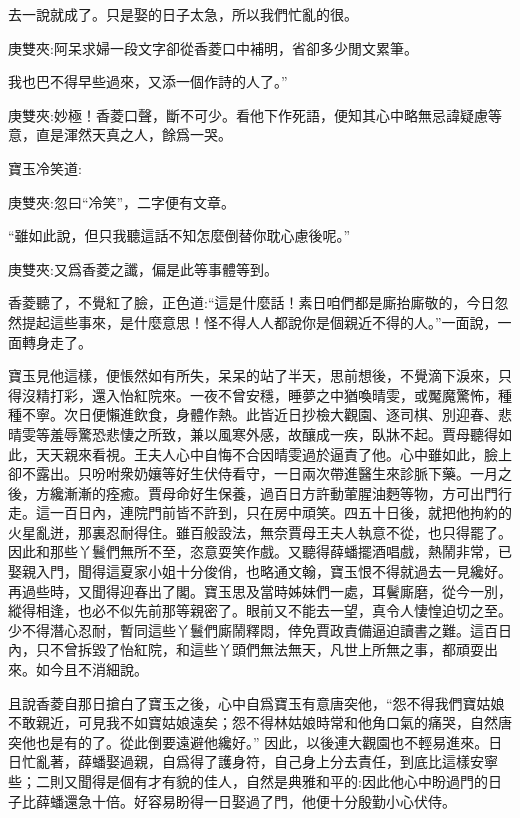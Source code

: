 \begin{parag}
去一說就成了。只是娶的日子太急，所以我們忙亂的很。\begin{note}庚雙夾:阿呆求婦一段文字卻從香菱口中補明，省卻多少閒文累筆。\end{note}我也巴不得早些過來，又添一個作詩的人了。”\begin{note}庚雙夾:妙極！香菱口聲，斷不可少。看他下作死語，便知其心中略無忌諱疑慮等意，直是渾然天真之人，餘爲一哭。\end{note}寶玉冷笑道:\begin{note}庚雙夾:忽曰“冷笑”，二字便有文章。\end{note}“雖如此說，但只我聽這話不知怎麼倒替你耽心慮後呢。”\begin{note}庚雙夾:又爲香菱之讖，偏是此等事體等到。\end{note}香菱聽了，不覺紅了臉，正色道:“這是什麼話！素日咱們都是廝抬廝敬的，今日忽然提起這些事來，是什麼意思！怪不得人人都說你是個親近不得的人。”一面說，一面轉身走了。
\end{parag}


\begin{parag}
    寶玉見他這樣，便悵然如有所失，呆呆的站了半天，思前想後，不覺滴下淚來，只得沒精打彩，還入怡紅院來。一夜不曾安穩，睡夢之中猶喚晴雯，或魘魔驚怖，種種不寧。次日便懶進飲食，身體作熱。此皆近日抄檢大觀園、逐司棋、別迎春、悲晴雯等羞辱驚恐悲悽之所致，兼以風寒外感，故釀成一疾，臥牀不起。賈母聽得如此，天天親來看視。王夫人心中自悔不合因晴雯過於逼責了他。心中雖如此，臉上卻不露出。只吩咐衆奶孃等好生伏侍看守，一日兩次帶進醫生來診脈下藥。一月之後，方纔漸漸的痊癒。賈母命好生保養，過百日方許動葷腥油麪等物，方可出門行走。這一百日內，連院門前皆不許到，只在房中頑笑。四五十日後，就把他拘約的火星亂迸，那裏忍耐得住。雖百般設法，無奈賈母王夫人執意不從，也只得罷了。因此和那些丫鬟們無所不至，恣意耍笑作戲。又聽得薛蟠擺酒唱戲，熱鬧非常，已娶親入門，聞得這夏家小姐十分俊俏，也略通文翰，寶玉恨不得就過去一見纔好。再過些時，又聞得迎春出了閣。寶玉思及當時姊妹們一處，耳鬢廝磨，從今一別，縱得相逢，也必不似先前那等親密了。眼前又不能去一望，真令人悽惶迫切之至。少不得潛心忍耐，暫同這些丫鬟們廝鬧釋悶，倖免賈政責備逼迫讀書之難。這百日內，只不曾拆毀了怡紅院，和這些丫頭們無法無天，凡世上所無之事，都頑耍出來。如今且不消細說。
\end{parag}


\begin{parag}
    且說香菱自那日搶白了寶玉之後，心中自爲寶玉有意唐突他，“怨不得我們寶姑娘不敢親近，可見我不如寶姑娘遠矣；怨不得林姑娘時常和他角口氣的痛哭，自然唐突他也是有的了。從此倒要遠避他纔好。” 因此，以後連大觀園也不輕易進來。日日忙亂著，薛蟠娶過親，自爲得了護身符，自己身上分去責任，到底比這樣安寧些；二則又聞得是個有才有貌的佳人，自然是典雅和平的:因此他心中盼過門的日子比薛蟠還急十倍。好容易盼得一日娶過了門，他便十分殷勤小心伏侍。
\end{parag}


